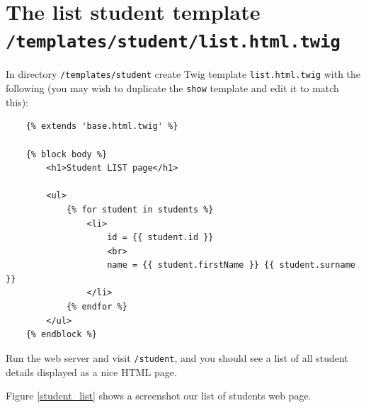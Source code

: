 \documentclass[a4paperpaper,openright]{book}
\newenvironment{Shaded}{}{}
\newcommand{\ExtensionTok}[1]{#1}
\newcommand{\NormalTok}[1]{#1}
\begin{document}
\begin{Shaded}
\end{Shaded}

\hypertarget{the-list-student-template-templatesstudentlist.html.twig}{%
\section{\texorpdfstring{The list student template
\texttt{/templates/student/list.html.twig}}{The list student template /templates/student/list.html.twig}}\label{the-list-student-template-templatesstudentlist.html.twig}}

In directory \texttt{/templates/student} create Twig template
\texttt{list.html.twig} with the following (you may wish to duplicate
the \texttt{show} template and edit it to match this):

\begin{verbatim}
    {% extends 'base.html.twig' %}

    {% block body %}
        <h1>Student LIST page</h1>

        <ul>
            {% for student in students %}
                <li>
                    id = {{ student.id }}
                    <br>
                    name = {{ student.firstName }} {{ student.surname }}
                </li>
            {% endfor %}
        </ul>
    {% endblock %}
\end{verbatim}

Run the web server and visit \texttt{/student}, and you should see a
list of all student details displayed as a nice HTML page.

Figure \ref{student_list} shows a screenshot our list of students web
page.
\end{document}
